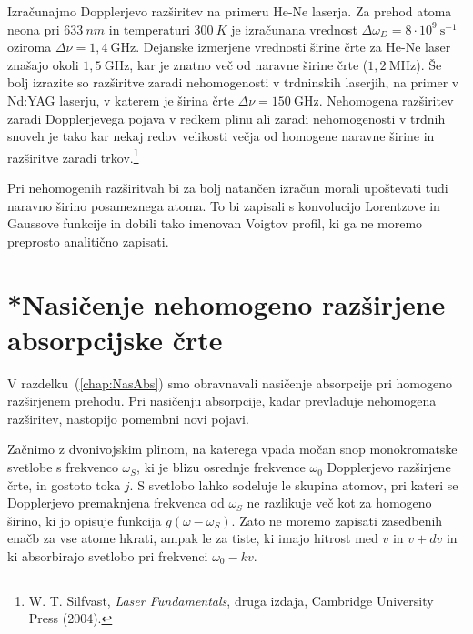 Izračunajmo Dopplerjevo razširitev na primeru He-Ne laserja. Za prehod
atoma neona pri $633~\si{nm}$ in temperaturi $300~\si{K}$ je izračunana vrednost
$\Delta\omega_{D}=8\cdot10^{9}~\si{\second}^{-1}$ oziroma $\Delta \nu = 1,4~\si{\giga\hertz}$. 
Dejanske izmerjene vrednosti širine črte za He-Ne laser 
znašajo okoli $1,5~\si{\giga\hertz}$, kar je znatno več od naravne širine
črte ($1,2~\si{\mega\hertz}$). Še bolj izrazite so razširitve zaradi nehomogenosti
v trdninskih laserjih, na primer v Nd:YAG laserju, v katerem 
je širina črte $\Delta \nu= 150~\si{\giga\hertz}$. Nehomogena razširitev zaradi Dopplerjevega pojava v 
redkem plinu ali zaradi nehomogenosti v trdnih snoveh je tako kar nekaj redov velikosti 
večja od homogene naravne širine in razširitve zaradi trkov.\footnote{W. T. Silfvast, {\it Laser Fundamentals}, druga izdaja, Cambridge University Press (2004).}

\begin{remark}
Pri nehomogenih razširitvah bi za bolj natančen izračun morali upoštevati 
tudi naravno širino posameznega atoma. To bi zapisali s konvolucijo Lorentzove
in Gaussove funkcije in dobili tako imenovan Voigtov 
profil, ki ga ne moremo preprosto analitično zapisati.
\end{remark}

\section{*Nasičenje nehomogeno razširjene absorpcijske črte}
\label{NasabsNehom}
V razdelku~(\ref{chap:NasAbs}) smo obravnavali nasičenje absorpcije pri homogeno 
razširjenem prehodu. Pri nasičenju absorpcije, kadar prevladuje nehomogena razširitev,
nastopijo pomembni novi pojavi.

Začnimo z dvonivojskim plinom, na katerega 
vpada močan snop monokromatske svetlobe s frekvenco $\omega_S$,
ki je blizu osrednje frekvence $\omega_{0}$ Dopplerjevo razširjene 
črte, in gostoto toka $j$. S svetlobo
lahko sodeluje le skupina atomov, pri kateri se Dopplerjevo premaknjena
frekvenca od $\omega_S$ ne razlikuje več kot za homogeno širino, ki
jo opisuje funkcija $g(\omega-\omega_S)$. Zato ne moremo zapisati zasedbenih
enačb za vse atome hkrati, ampak le za tiste, ki imajo hitrost med
$v$ in $v+dv$ in ki absorbirajo svetlobo pri frekvenci $\omega_{0}-kv$.

